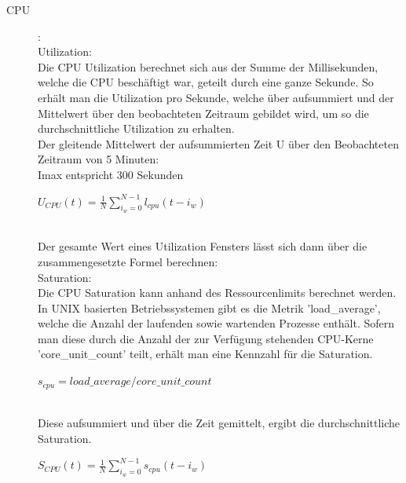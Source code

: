 \documentclass[a4paper,10pt]{scrartcl}
\begin{document}
\begin{description}
\item[CPU]:\\
Utilization:\\
Die CPU Utilization berechnet sich aus der Summe der Millisekunden, welche die CPU beschäftigt war, geteilt durch eine ganze Sekunde. So erhält man die Utilization pro Sekunde, welche über aufsummiert und der Mittelwert über den beobachteten Zeitraum gebildet wird, um so die durchschnittliche Utilization zu erhalten.\\

Der gleitende Mittelwert der aufsummierten Zeit U über den Beobachteten Zeitraum von 5 Minuten:\\
Imax entspricht 300 Sekunden

\begin{Huge}
\(
\displaystyle{U_{CPU}(t)=\frac{1}{N}{\sum\limits_{i_{w}=0}^{N-1} l_{cpu}{(t-i_{w})}} }
\) 
\end{Huge}\\
Der gesamte Wert eines Utilization Fensters lässt sich dann über die zusammengesetzte Formel berechnen:\\

Saturation:\\
Die CPU Saturation kann anhand des Ressourcenlimits berechnet werden. In UNIX basierten Betriebssystemen gibt es die Metrik 'load\_average', welche die Anzahl der laufenden sowie wartenden Prozesse enthält. Sofern man diese durch die Anzahl der zur Verfügung stehenden CPU-Kerne 'core\_unit\_count' teilt, erhält man eine Kennzahl für die Saturation. 

\begin{Huge}
\(
\displaystyle{s_{cpu}= load\_average / core\_unit\_count}
\)
\end{Huge}\\

Diese aufsummiert und über die Zeit gemittelt, ergibt die durchschnittliche Saturation.\\

\begin{Huge}
\(
\displaystyle{S_{CPU}(t)=\frac{1}{N}{\sum\limits_{i_{w}=0}^{N-1} s_{cpu}{(t-i_{w})}} }
\)
\end{Huge}\\


\end{description}
\end{document}
